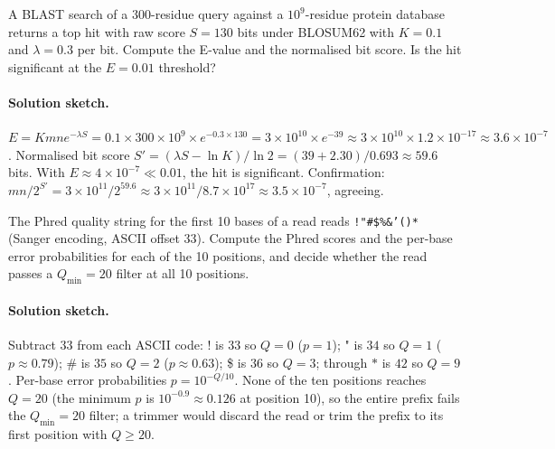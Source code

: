 \begin{exercise}
A BLAST search of a $300$-residue query against a $10^{9}$-residue
protein database returns a top hit with raw score $S = 130$ bits
under BLOSUM62 with $K = 0.1$ and $\lambda = 0.3$ per bit. Compute the
E-value and the normalised bit score. Is the hit significant at the
$E = 0.01$ threshold?

\paragraph{Solution sketch.}
$E = K m n e^{-\lambda S} = 0.1 \times 300 \times 10^{9} \times
e^{-0.3 \times 130} = 3 \times 10^{10} \times e^{-39} \approx 3 \times
10^{10} \times 1.2 \times 10^{-17} \approx 3.6 \times 10^{-7}$.
Normalised bit score $S' = (\lambda S - \ln K)/\ln 2 = (39 + 2.30)/0.693
\approx 59.6$ bits. With $E \approx 4 \times 10^{-7} \ll 0.01$, the
hit is significant. Confirmation: $m n / 2^{S'} = 3 \times 10^{11} /
2^{59.6} \approx 3 \times 10^{11} / 8.7 \times 10^{17} \approx 3.5
\times 10^{-7}$, agreeing.
\end{exercise}

\begin{exercise}
The Phred quality string for the first 10 bases of a read reads
\texttt{!"\#\$\%\&'()*} (Sanger encoding, ASCII offset 33). Compute the
Phred scores and the per-base error probabilities for each of the 10
positions, and decide whether the read passes a $Q_{\mathrm{min}}=20$
filter at all 10 positions.

\paragraph{Solution sketch.}
Subtract 33 from each ASCII code: ! is $33$ so $Q=0$ ($p=1$); " is
$34$ so $Q=1$ ($p\approx 0.79$); \# is $35$ so $Q=2$ ($p\approx 0.63$);
\$ is $36$ so $Q=3$; through $*$ is $42$ so $Q=9$. Per-base error
probabilities $p = 10^{-Q/10}$. None of the ten positions reaches
$Q=20$ (the minimum $p$ is $10^{-0.9} \approx 0.126$ at position 10),
so the entire prefix fails the $Q_{\mathrm{min}}=20$ filter; a trimmer
would discard the read or trim the prefix to its first position with
$Q\geq 20$.
\end{exercise}

